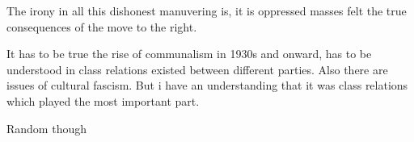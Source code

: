 \documentclass[14pt]{extarticle}
\begin{document}
The irony in all this dishonest manuvering is, it is oppressed masses felt the
true consequences of the move to the right.

It has to be true the rise of communalism in 1930s and onward, has to be
understood in class relations existed between different parties. Also there are
issues of cultural fascism. But i have an understanding that it was class
relations which played the most important part.

{\Large Random though }\\[3mm]


\blockquote{\small } 
\end{document}
